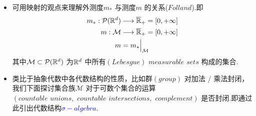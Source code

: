 	\begin{rmk}
		\begin{itemize}
			\item 可用映射的观点来理解外测度$m_{*}$ 与测度$m$ 的关系($Folland$).即
			\begin{align}
				m_{*} : \mathcal{P}(\mathbb{R}^d) &\longrightarrow \overline{\mathbb{R}}_{+} = [0 , +\infty] \\
				m : \mathcal{M} &\longrightarrow \overline{\mathbb{R}}_{+} = [0 , +\infty] \\
				m &= m_{*} \Big|_{\mathcal{M}}
			\end{align}
			其中$\mathcal{M} \subset \mathcal{P}(\mathbb{R}^d)$ 为$\mathbb{R}^d$ 中所有$(Lebesgue) \,\, measurable \,\, sets$ 构成的集合.
			
			\vspace{1em}
			
			\item 类比于抽象代数中各代数结构的性质，比如群$(group)$ 对加法 / 乘法封闭，我们下面探讨集合族$\mathcal{M}$ 对于可数个集合的运算$(countable \,\, unions , \,\, countable \,\, intersections , \,\, complement)$ 是否封闭.即通过此引出代数结构\textcolor{blue}{$\sigma-algebra$}.
		\end{itemize}
	\end{rmk}

	\vspace{2em}
